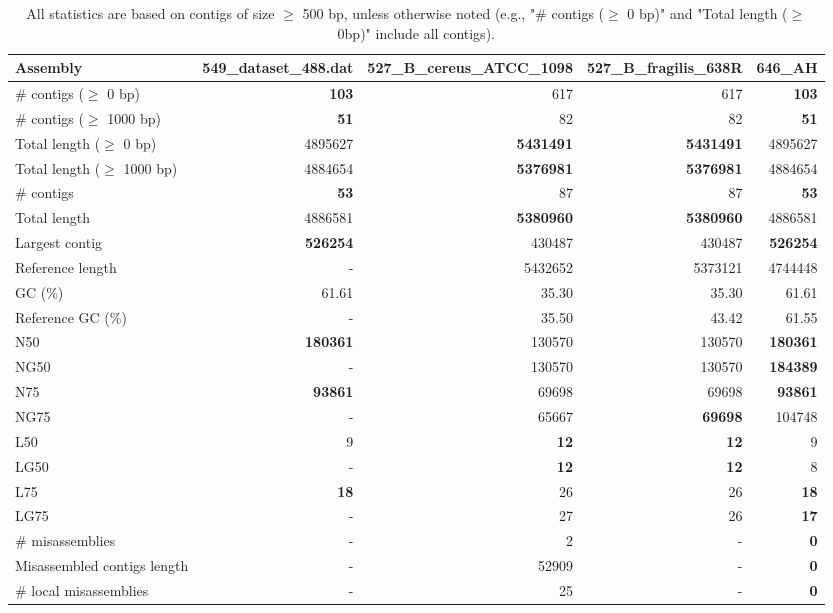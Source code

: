 \documentclass[12pt,a4paper]{article}
\begin{document}
\begin{table}[ht]
\begin{center}
\caption{All statistics are based on contigs of size $\geq$ 500 bp, unless otherwise noted (e.g., "\# contigs ($\geq$ 0 bp)" and "Total length ($\geq$ 0bp)" include all contigs).}
\begin{tabular}{|l*{4}{|r}|}
\hline
Assembly & 549\_dataset\_488.dat & 527\_B\_cereus\_ATCC\_1098 & 527\_B\_fragilis\_638R & 646\_AH \\ \hline
\# contigs ($\geq$ 0 bp) & {\bf 103} & 617 & 617 & {\bf 103} \\ \hline
\# contigs ($\geq$ 1000 bp) & {\bf 51} & 82 & 82 & {\bf 51} \\ \hline
Total length ($\geq$ 0 bp) & 4895627 & {\bf 5431491} & {\bf 5431491} & 4895627 \\ \hline
Total length ($\geq$ 1000 bp) & 4884654 & {\bf 5376981} & {\bf 5376981} & 4884654 \\ \hline
\# contigs & {\bf 53} & 87 & 87 & {\bf 53} \\ \hline
Total length & 4886581 & {\bf 5380960} & {\bf 5380960} & 4886581 \\ \hline
Largest contig & {\bf 526254} & 430487 & 430487 & {\bf 526254} \\ \hline
Reference length & - & 5432652 & 5373121 & 4744448 \\ \hline
GC (\%) & 61.61 & 35.30 & 35.30 & 61.61 \\ \hline
Reference GC (\%) & - & 35.50 & 43.42 & 61.55 \\ \hline
N50 & {\bf 180361} & 130570 & 130570 & {\bf 180361} \\ \hline
NG50 & - & 130570 & 130570 & {\bf 184389} \\ \hline
N75 & {\bf 93861} & 69698 & 69698 & {\bf 93861} \\ \hline
NG75 & - & 65667 & {\bf 69698} & 104748 \\ \hline
L50 & 9 & {\bf 12} & {\bf 12} & 9 \\ \hline
LG50 & - & {\bf 12} & {\bf 12} & 8 \\ \hline
L75 & {\bf 18} & 26 & 26 & {\bf 18} \\ \hline
LG75 & - & 27 & 26 & {\bf 17} \\ \hline
\# misassemblies & - & 2 & - & {\bf 0} \\ \hline
Misassembled contigs length & - & 52909 & - & {\bf 0} \\ \hline
\# local misassemblies & - & 25 & - & {\bf 0} \\ \hline

\end{tabular}
\end{center}
\end{table}
\end{document}
